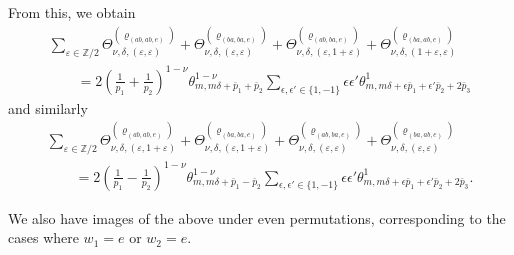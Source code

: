 \documentclass[pdftex]{sigma}
\newcommand{\ZZ}{\mathbb{Z}}
\def\bos{\varrho}
\theoremstyle{definition}
\numberwithin{equation}{section}
\begin{document}
From this, we obtain
\begin{gather*}
 \sum_{\varepsilon\in\ZZ/2}\Theta_{\nu,\delta,(\varepsilon,\varepsilon)}^{(\bos_{(ab,ab,e)})} +\Theta_{\nu,\delta,(\varepsilon,\varepsilon)}^{(\bos_{(ba,ba,e)})}
+ \Theta_{\nu,\delta,(\varepsilon,1+\varepsilon)}^{(\bos_{(ab,ba,e)})} +\Theta_{\nu,\delta,
(1+\varepsilon,\varepsilon)}^{(\bos_{(ba,ab,e)})} \\
 \qquad = 2 \left(\frac{1}{p_1}+\frac{1}{p_2}\right)^{1-\nu}
 \theta^{1-\nu}_{m,m\delta+\bar p_1+ \bar p_2} \sum_{\epsilon,\epsilon'\in \{1,-1\}} \epsilon \epsilon' \theta^1_{m,m\delta+ \epsilon\bar p_1+ \epsilon'\bar p_2+ 2\bar p_3}
\end{gather*}
and similarly
\begin{gather*}
\sum_{\varepsilon\in\ZZ/2}\Theta_{\nu,\delta,(\varepsilon,1+\varepsilon)}^{(\bos_{(ab,ab,e)})} +\Theta_{\nu,\delta,(\varepsilon,1+\varepsilon)}^{(\bos_{(ba,ba,e)})}
+ \Theta_{\nu,\delta,(\varepsilon,\varepsilon)}^{(\bos_{(ab,ba,e)})} +\Theta_{\nu,\delta,(\varepsilon,\varepsilon)}^{(\bos_{(ba,ab,e)})} \\
 \qquad = 2\left(\frac{1}{p_1}-\frac{1}{p_2}\right)^{1-\nu}
 \theta^{1-\nu}_{m,m\delta+\bar p_1-\bar p_2} \sum_{\epsilon,\epsilon'\in \{1,-1\}} \epsilon \epsilon' \theta^1_{m,m\delta+\epsilon \bar p_1+ \epsilon' \bar p_2+2\bar p_3} .
\end{gather*}

We also have images of the above under even permutations, corresponding to the cases where $w_1=e$ or $w_2=e$.
\end{document}
